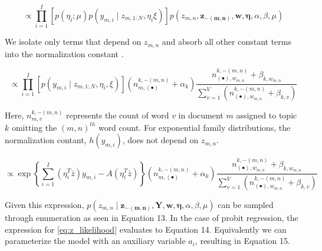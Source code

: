 \documentclass{article}
\begin{document}
\begin{equation}
\propto\prod_{i=1}^{I}\left[p\left(\eta_{i};\mu\right)p\left(y_{m,i}\mid z_{m,1:N},\eta_{i}\xi\right)\right]p\left(z_{m,n},\mathbf{z_{-\left(m,n\right)}},\mathbf{w},\mathbf{\eta},\alpha,\beta,\mu\right)\end{equation}


We isolate only terms that depend on $z_{m,n}$ and absorb all other
constant terms into the normalization constant \citep{Griffiths04}.



\begin{equation}
\propto\prod_{i=1}^{I}\left[p\left(y_{m,i}\mid z_{m,1:N},\eta_{i},\xi\right)\right]\left(n_{m,\left(\bullet\right)}^{k,-\left(m,n\right)}+\alpha_{k}\right)\frac{n_{\left(\bullet\right),w_{m,n}}^{k,-\left(m,n\right)}+\beta_{k,w_{m,n}}}{\sum_{v=1}^{V}\left(n_{\left(\bullet\right),w_{m,n}}^{k,-\left(m,n\right)}+\beta_{k,v}\right)}\end{equation}


Here, $n_{m,v}^{k,-\left(m,n\right)}$ represents the count of word
$v$ in document $m$ assigned to topic $k$ omitting the $(m,n)^{th}$
word count. For exponential family distributions, the normalization
contant, $h(y_{m,i})$, does not depend on $z_{m,n}$.

\begin{equation}
\propto\exp\left\{ \sum_{i=1}^{I}\left(\eta_{i}^{T}\bar{z}\right)y_{m,i}-A\left(\eta_{i}^{T}\bar{z}\right)\right\} \left(n_{m,\left(\bullet\right)}^{k,-\left(m,n\right)}+\alpha_{k}\right)\frac{n_{\left(\bullet\right),w_{m,n}}^{k,-\left(m,n\right)}+\beta_{k,w_{m,n}}}{\sum_{v=1}^{V}\left(n_{\left(\bullet\right),w_{m,n}}^{k,-\left(m,n\right)}+\beta_{k,v}\right)}\label{eq:z_likelihood}\end{equation}


Given this expression, $p\left(z_{m,n}\mid\mathbf{z_{-\left(m,n\right)}},\mathbf{Y},\mathbf{w},\mathbf{\eta},\alpha,\beta,\mu\right)$
can be sampled through enumeration as seen in Equation 13.  In the case of probit regression, the expression for \ref{eq:z_likelihood} evaluates
to Equation 14.  Equivalently we can parameterize the model with an auxiliary variable
$a_{i}$, resulting in Equation 15.
\end{document}

